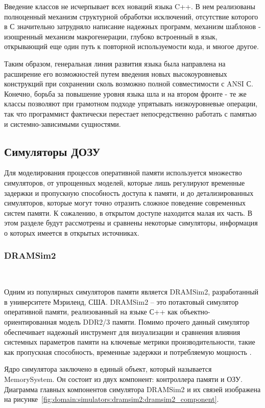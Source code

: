 Введение классов не исчерпывает всех новаций языка C++. В нем реализованы полноценный механизм структурной обработки исключений, отсутствие которого в С значительно затрудняло написание надежных программ, механизм шаблонов - изощренный механизм макрогенерации, глубоко встроенный в язык, открывающий еще один путь к повторной используемости кода, и многое другое.

Таким образом, генеральная линия развития языка была направлена на расширение его возможностей путем введения новых высокоуровневых конструкций при сохранении сколь возможно полной совместимости с ANSI С. Конечно, борьба за повышение уровня языка шла и на втором фронте - те же классы позволяют при грамотном подходе упрятывать низкоуровневые операции, так что программист фактически перестает непосредственно работать с памятью и системно-зависимыми сущностями.

\subsection{Симуляторы ДОЗУ}
\label{page:domain:simulators}

Для моделирования процессов оперативной памяти используется множество симуляторов, от упрощенных моделей, которые лишь регулируют временные задержки и пропускную способность доступа к памяти, и до детализированных симуляторов, которые могут точно отразить сложное поведение современных систем памяти. К сожалению, в открытом доступе находится малая их часть. В этом разделе будут рассмотрены и сравнены некоторые симуляторы, информация о которых имеется в открытых источниках.

\subsubsection{DRAMSim2}~\\
\label{page:domain:simulators:dramsim2}

Одним из популярных симуляторов памяти является DRAMSim2, разработанный в университете Мэриленд, США. 
DRAMSim2 – это потактовый симулятор оперативной памяти, реализованный на языке С++ как объектно-ориентированная модель DDR2/3 памяти. Помимо прочего данный симулятор обеспечивает надежный инструмент для визуализации и сравнения влияния системных параметров памяти на ключевые метрики производительности, такие как пропускная способность, временные задержки и потребляемую мощность \cite{dramsim2_article}.

Ядро симулятора заключено в единый объект, который называется MemorySystem. Он состоит из двух компонент: контроллера памяти и ОЗУ. Диаграмма главных компонентов симулятора DRAMSim2 и их связей изображена на рисунке~\ref{fig:domain:simulators:dramsim2:dramsim2_component}. 

